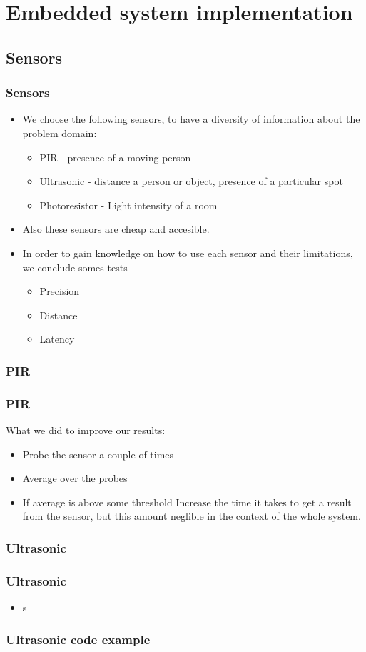 \section{Embedded system implementation}
\subsection{Sensors}
\begin{frame}
	\frametitle{Sensors}
	\begin{itemize}
		\item We choose the following sensors, to have a diversity of information about the problem domain:
		\begin{itemize}
		  \item PIR - presence of a moving person
		  \item Ultrasonic - distance a person or object, presence of a particular spot
		  \item Photoresistor - Light intensity of a room
		\end{itemize}
		\item Also these sensors are cheap and accesible.
		\item In order to gain knowledge on how to use each sensor and their limitations, we conclude somes tests
		\begin{itemize}
		  \item Precision
		  \item Distance
		  \item Latency
		\end{itemize}
	\end{itemize}
\end{frame}
\subsubsection{PIR}
\begin{frame}
  \frametitle{PIR}
  What we did to improve our results:
	\begin{itemize}
	  \item Probe the sensor a couple of times
	  \item Average over the probes
	  \item If average is above some threshold
	Increase the time it takes to get a result from the sensor, but this amount neglible in the context of the whole system.
	\end{itemize}
\end{frame}
\subsubsection{Ultrasonic}
\begin{frame}
	\frametitle{Ultrasonic}
	\begin{itemize}
    \item s
	\end{itemize}
\end{frame}
\begin{frame}
	\frametitle{Ultrasonic code example}
	
\end{frame}
